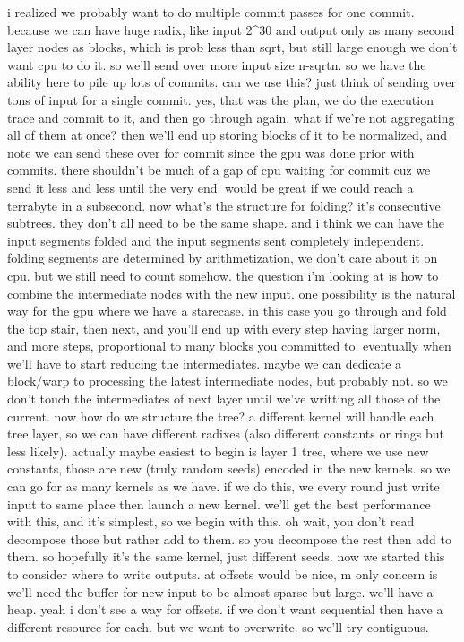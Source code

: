 i realized we probably want to do multiple commit passes for one commit. because we can have huge radix, like input 2^30 and output only as many second layer nodes as blocks, which is prob less than sqrt, but still large enough we don't want cpu to do it. so we'll send over more input size n-sqrt{n}. so we have the ability here to pile up lots of commits. can we use this? just think of sending over tons of input for a single commit. yes, that was the plan, we do the execution trace and commit to it, and then go through again. what if we're not aggregating all of them at once? then we'll end up storing blocks of it to be normalized, and note we can send these over for commit since the gpu was done prior with commits. there shouldn't be much of a gap of cpu waiting for commit cuz we send it less and less until the very end. 
would be great if we could reach a terrabyte in a subsecond.
now what's the structure for folding? it's consecutive subtrees. 
they don't all need to be the same shape. and i think we can have the input segments folded and the input segments sent completely independent. folding segments are determined by arithmetization, we don't care about it on cpu. but we still need to count somehow. 
the question i'm looking at is how to combine the intermediate nodes with the new input. 
one possibility is the natural way for the gpu where we have a starecase. in this case you go through and fold the top stair, then next, and you'll end up with every step having larger norm, and more steps, proportional to many blocks you committed to. 
eventually when we'll have to start reducing the intermediates. maybe we can dedicate a block/warp to processing the latest intermediate nodes, but probably not. so we don't touch the intermediates of next layer until we've writting all those of the current.
now how do we structure the tree? a different kernel will handle each tree layer, so we can have different radixes (also different constants or rings but less likely).
actually maybe easiest to begin is layer 1 tree, where we use new constants, those are new (truly random seeds) encoded in the new kernels. so we can go for as many kernels as we have. 
if we do this, we every round just write input to same place then launch a new kernel. we'll get the best performance with this, and it's simplest, so we begin with this. oh wait, you don't read decompose those but rather add to them. so you decompose the rest then add to them. so hopefully it's the same kernel, just different seeds. 
now we started this to consider where to write outputs. at offsets would be nice, m only concern is we'll need the buffer for new input to be almost sparse but large. we'll have a heap. yeah i don't see a way for offsets. if we don't want sequential then have a different resource for each. but we want to overwrite. so we'll try contiguous. 

